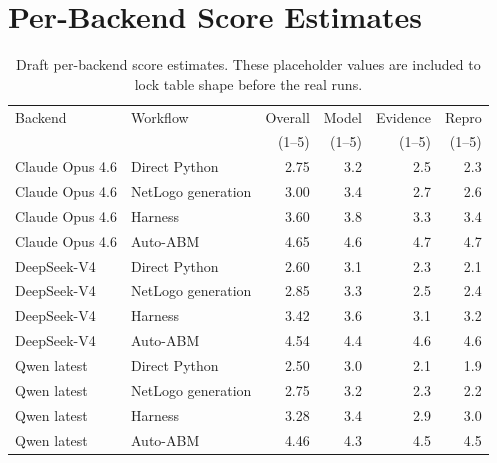 \documentclass[11pt]{article}
\newcommand{\sys}{Auto-ABM}
\begin{document}
\section{Per-Backend Score Estimates}
\label{app:backend-results}

\begin{table}[t]
  \centering
  \small
  \begin{tabular}{llrrrr}
    \toprule
    Backend & Workflow & Overall & Model & Evidence & Repro \\
    & & (1--5) & (1--5) & (1--5) & (1--5) \\
    \midrule
    Claude Opus 4.6 & Direct Python & 2.75 & 3.2 & 2.5 & 2.3 \\
    Claude Opus 4.6 & NetLogo generation & 3.00 & 3.4 & 2.7 & 2.6 \\
    Claude Opus 4.6 & Harness & 3.60 & 3.8 & 3.3 & 3.4 \\
    Claude Opus 4.6 & \sys{} & 4.65 & 4.6 & 4.7 & 4.7 \\
    DeepSeek-V4 & Direct Python & 2.60 & 3.1 & 2.3 & 2.1 \\
    DeepSeek-V4 & NetLogo generation & 2.85 & 3.3 & 2.5 & 2.4 \\
    DeepSeek-V4 & Harness & 3.42 & 3.6 & 3.1 & 3.2 \\
    DeepSeek-V4 & \sys{} & 4.54 & 4.4 & 4.6 & 4.6 \\
    Qwen latest & Direct Python & 2.50 & 3.0 & 2.1 & 1.9 \\
    Qwen latest & NetLogo generation & 2.75 & 3.2 & 2.3 & 2.2 \\
    Qwen latest & Harness & 3.28 & 3.4 & 2.9 & 3.0 \\
    Qwen latest & \sys{} & 4.46 & 4.3 & 4.5 & 4.5 \\
    \bottomrule
  \end{tabular}
  \caption{Draft per-backend score estimates. These placeholder values are included to lock table shape before the real runs.}
  \label{tab:backend-results}
\end{table}
\end{document}
